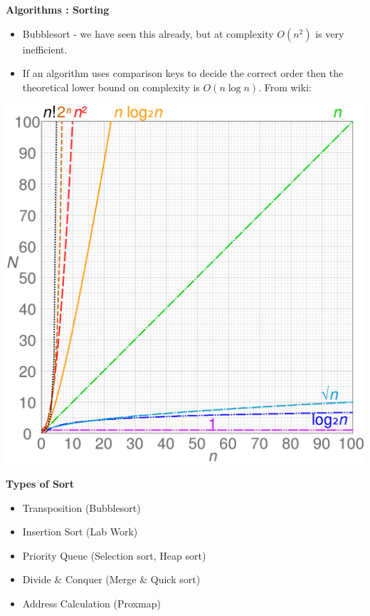 \newpage
{\samepage
\begin{center}
{\Large{\bf Algorithms : Sorting}}
\end{center}
\begin{itemize}
\item Bubblesort - we have seen this already, but at complexity $O(n^2)$ is
very inefficient.
\item If an algorithm uses comparison keys to decide the correct order
then the theoretical lower bound on complexity is $O(n \log n )$. From
wiki:
\end{itemize}
\begin{center}
\includegraphics[width=\textwidth]{../Images/1280px-Comparison_computational_complexity.png}
\end{center}

}

\newpage
{\samepage
\begin{center}
{\Large{\bf Types of Sort}}
\end{center}
\begin{itemize}
\item Transposition (Bubblesort)
\item Insertion Sort (Lab Work)
\item Priority Queue (Selection sort, Heap sort)
\item Divide \& Conquer (Merge \& Quick sort)
\item Address Calculation (Proxmap)
\end{itemize}
}

